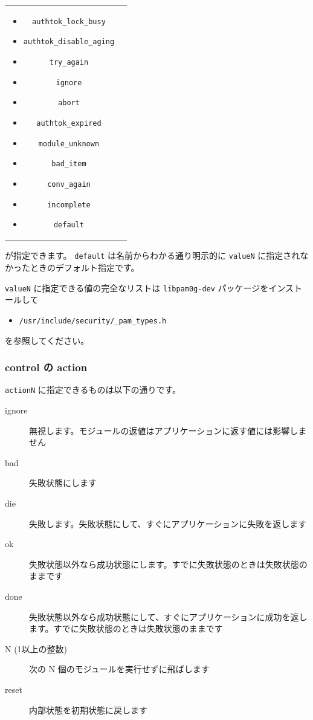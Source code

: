 \documentclass[mingoth,a4paper]{jsarticle}
\begin{document}
{\begin{tabular}{cc}
\begin{minipage}[b]{0.3\textwidth}
\begin{itemize}
    \end{itemize}
  \end{minipage}
  \begin{minipage}[b]{0.3\textwidth}
    \begin{itemize}
    \item \verb~authtok_lock_busy~
    \item \verb~authtok_disable_aging~
    \item \verb~try_again~
    \item \verb~ignore~
    \item \verb~abort~
    \item \verb~authtok_expired~
    \item \verb~module_unknown~
    \item \verb~bad_item~
    \item \verb~conv_again~
    \item \verb~incomplete~
    \item \verb~default~
    \end{itemize}
  \end{minipage}
\end{tabular}
}

が指定できます。
\verb~default~ は名前からわかる通り明示的に \verb~valueN~ に指定されなかったときのデフォルト指定です。

\verb~valueN~ に指定できる値の完全なリストは \verb~libpam0g-dev~ パッケージをインストールして
\begin{itemize}
\item \verb~/usr/include/security/_pam_types.h~
\end{itemize}
を参照してください。
\subsubsection{control の action}
\label{sec-1-4-5}

\verb~actionN~ に指定できるものは以下の通りです。

\begin{description}
\item[ignore] 無視します。モジュールの返値はアプリケーションに返す値には影響しません
\item[bad] 失敗状態にします
\item[die] 失敗します。失敗状態にして、すぐにアプリケーションに失敗を返します
\item[ok] 失敗状態以外なら成功状態にします。すでに失敗状態のときは失敗状態のままです
\item[done] 失敗状態以外なら成功状態にして、すぐにアプリケーションに成功を返します。すでに失敗状態のときは失敗状態のままです
\item[N (1以上の整数)] 次の N 個のモジュールを実行せずに飛ばします
\item[reset] 内部状態を初期状態に戻します
\end{description}
\end{document}
